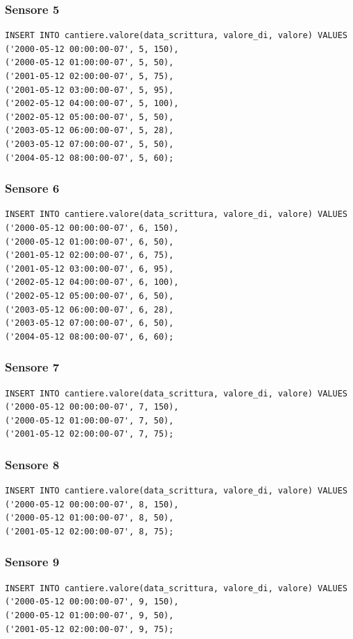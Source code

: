 \documentclass[11pt]{article}
\begin{document}
\subsubsection*{Sensore 5}
\label{sec:org739c6dc}
\begin{verbatim}
INSERT INTO cantiere.valore(data_scrittura, valore_di, valore) VALUES
('2000-05-12 00:00:00-07', 5, 150),
('2000-05-12 01:00:00-07', 5, 50),
('2001-05-12 02:00:00-07', 5, 75),
('2001-05-12 03:00:00-07', 5, 95),
('2002-05-12 04:00:00-07', 5, 100),
('2002-05-12 05:00:00-07', 5, 50),
('2003-05-12 06:00:00-07', 5, 28),
('2003-05-12 07:00:00-07', 5, 50),
('2004-05-12 08:00:00-07', 5, 60);
\end{verbatim}
\subsubsection*{Sensore 6}
\label{sec:org5362042}
\begin{verbatim}
INSERT INTO cantiere.valore(data_scrittura, valore_di, valore) VALUES
('2000-05-12 00:00:00-07', 6, 150),
('2000-05-12 01:00:00-07', 6, 50),
('2001-05-12 02:00:00-07', 6, 75),
('2001-05-12 03:00:00-07', 6, 95),
('2002-05-12 04:00:00-07', 6, 100),
('2002-05-12 05:00:00-07', 6, 50),
('2003-05-12 06:00:00-07', 6, 28),
('2003-05-12 07:00:00-07', 6, 50),
('2004-05-12 08:00:00-07', 6, 60);
\end{verbatim}
\subsubsection*{Sensore 7}
\label{sec:org7763171}
\begin{verbatim}
INSERT INTO cantiere.valore(data_scrittura, valore_di, valore) VALUES
('2000-05-12 00:00:00-07', 7, 150),
('2000-05-12 01:00:00-07', 7, 50),
('2001-05-12 02:00:00-07', 7, 75);
\end{verbatim}
\subsubsection*{Sensore 8}
\label{sec:orgb2e50b6}
\begin{verbatim}
INSERT INTO cantiere.valore(data_scrittura, valore_di, valore) VALUES
('2000-05-12 00:00:00-07', 8, 150),
('2000-05-12 01:00:00-07', 8, 50),
('2001-05-12 02:00:00-07', 8, 75);
\end{verbatim}
\subsubsection*{Sensore 9}
\label{sec:org691788f}
\begin{verbatim}
INSERT INTO cantiere.valore(data_scrittura, valore_di, valore) VALUES
('2000-05-12 00:00:00-07', 9, 150),
('2000-05-12 01:00:00-07', 9, 50),
('2001-05-12 02:00:00-07', 9, 75);
\end{verbatim}
\end{document}
